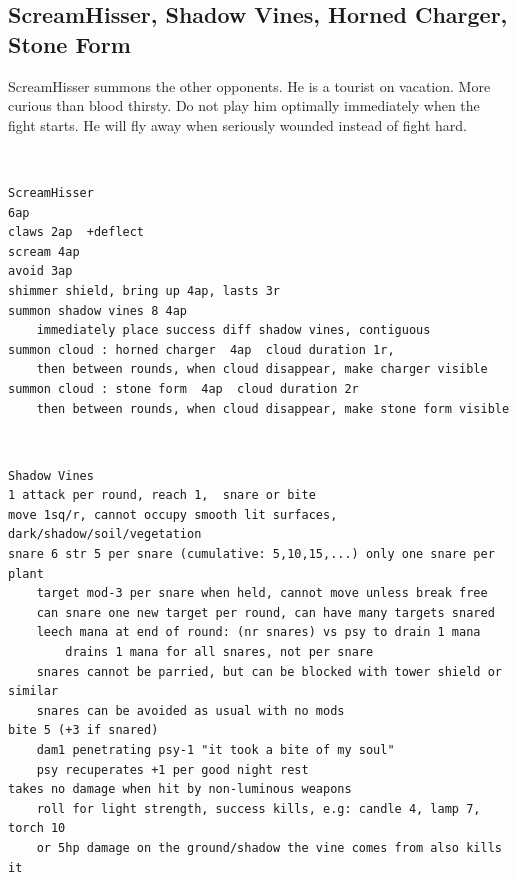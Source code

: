 \subsection*{ScreamHisser, Shadow Vines, Horned Charger, Stone Form}
\label{sec:screamhisserstats}
ScreamHisser summons the other opponents. He is a tourist on vacation. More curious than blood thirsty. Do not play him optimally immediately when the fight starts. He will fly away when seriously wounded instead of fight hard.

\

\begin{samepage} \small \begin{verbatim}
ScreamHisser
6ap
claws 2ap  +deflect
scream 4ap
avoid 3ap
shimmer shield, bring up 4ap, lasts 3r
summon shadow vines 8 4ap
    immediately place success diff shadow vines, contiguous
summon cloud : horned charger  4ap  cloud duration 1r,
    then between rounds, when cloud disappear, make charger visible
summon cloud : stone form  4ap  cloud duration 2r
    then between rounds, when cloud disappear, make stone form visible
\end{verbatim} \normalsize \end{samepage}

\

\begin{samepage} \small \begin{verbatim}
Shadow Vines
1 attack per round, reach 1,  snare or bite
move 1sq/r, cannot occupy smooth lit surfaces, dark/shadow/soil/vegetation
snare 6 str 5 per snare (cumulative: 5,10,15,...) only one snare per plant
    target mod-3 per snare when held, cannot move unless break free
    can snare one new target per round, can have many targets snared
    leech mana at end of round: (nr snares) vs psy to drain 1 mana
        drains 1 mana for all snares, not per snare
    snares cannot be parried, but can be blocked with tower shield or similar
    snares can be avoided as usual with no mods
bite 5 (+3 if snared)
    dam1 penetrating psy-1 "it took a bite of my soul"
    psy recuperates +1 per good night rest
takes no damage when hit by non-luminous weapons
    roll for light strength, success kills, e.g: candle 4, lamp 7, torch 10
    or 5hp damage on the ground/shadow the vine comes from also kills it
\end{verbatim} \normalsize \end{samepage}

